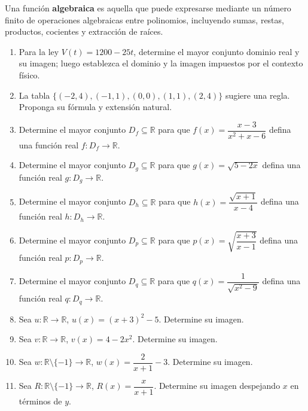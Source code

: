 \documentclass[10pt,a5paper]{article}
\begin{document}
\begin{definicion}
Una función \textbf{algebraica} es aquella que puede expresarse mediante un número finito de operaciones algebraicas entre polinomios, incluyendo sumas, restas, productos, cocientes y extracción de raíces.
\end{definicion}

\begin{ejercicios}
\begin{enumerate}
  \item Para la ley $V(t)=1200-25t$, determine el mayor conjunto dominio real y su imagen; luego establezca el dominio y la imagen impuestos por el contexto físico.
  \item La tabla $\{(-2,4),(-1,1),(0,0),(1,1),(2,4)\}$ sugiere una regla. Proponga su fórmula y extensión natural.
  \item Determine el mayor conjunto $D_f\subseteq\mathbb{R}$ para que $f(x)=\dfrac{x-3}{x^2+x-6}$ defina una función real $f:D_f\to\mathbb{R}$.
  \item Determine el mayor conjunto $D_g\subseteq\mathbb{R}$ para que $g(x)=\sqrt{5-2x}$ defina una función real $g:D_g\to\mathbb{R}$.
  \item Determine el mayor conjunto $D_h\subseteq\mathbb{R}$ para que $h(x)=\dfrac{\sqrt{x+1}}{x-4}$ defina una función real $h:D_h\to\mathbb{R}$.
  \item Determine el mayor conjunto $D_p\subseteq\mathbb{R}$ para que $p(x)=\sqrt{\dfrac{x+3}{x-1}}$ defina una función real $p:D_p\to\mathbb{R}$.
  \item Determine el mayor conjunto $D_q\subseteq\mathbb{R}$ para que $q(x)=\dfrac{1}{\sqrt{x^2-9}}$ defina una función real $q:D_q\to\mathbb{R}$.
  \item Sea $u:\mathbb{R}\to\mathbb{R}$, $u(x)=(x+3)^2-5$. Determine su imagen.
  \item Sea $v:\mathbb{R}\to\mathbb{R}$, $v(x)=4-2x^2$. Determine su imagen.
  \item Sea $w:\mathbb{R}\setminus\{-1\}\to\mathbb{R}$, $w(x)=\dfrac{2}{x+1}-3$. Determine su imagen.
  \item Sea $R:\mathbb{R}\setminus\{-1\}\to\mathbb{R}$, $R(x)=\dfrac{x}{x+1}$. Determine su imagen despejando $x$ en términos de $y$.
\end{enumerate}
\end{ejercicios}
\end{document}
